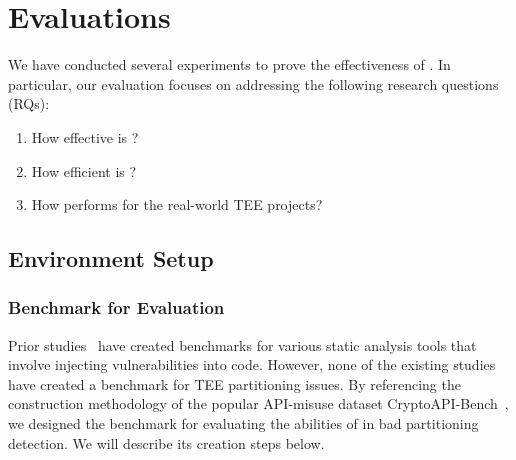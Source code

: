 \section{Evaluations} \label{s:eva}
We have conducted several experiments to prove the effectiveness of \ccSysName. In particular, our evaluation focuses on addressing the following research questions (RQs):

\begin{enumerate}[label=\textbf{RQ\arabic*.}]
    \item How effective is \ccSysName?
    \item How efficient is \ccSysName?
    \item How \ccSysName performs for the real-world TEE projects?
\end{enumerate}

\subsection{Environment Setup}
\subsubsection{Benchmark for Evaluation} \label{s:bench}

Prior studies~\cite{10.1145/3540250.3549128, 8901573} have created benchmarks for various static analysis tools that involve injecting vulnerabilities into code.
However, none of the existing studies have created a benchmark for TEE partitioning issues.
By referencing the construction methodology of the popular API-misuse dataset CryptoAPI-Bench~\cite{8901573, 9721567, 10225251}, we designed the benchmark \ccBenchName for evaluating the abilities of \ccSysName in bad partitioning detection.
We will describe its creation steps below.

